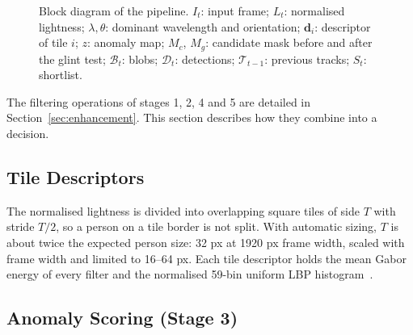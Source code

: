 \documentclass[conference,a4paper]{IEEEtran}
\begin{document}
\begin{figure}[!t]
{%
}
\caption{Block diagram of the pipeline. $I_t$: input frame; $L_t$: normalised lightness; $\lambda,\theta$: dominant wavelength and orientation; $\mathbf{d}_i$: descriptor of tile $i$; $z$: anomaly map; $M_c$, $M_g$: candidate mask before and after the glint test; $\mathcal{B}_t$: blobs; $\mathcal{D}_t$: detections; $\mathcal{T}_{t-1}$: previous tracks; $S_t$: shortlist.}
\label{fig:pipeline}
\end{figure}

The filtering operations of stages 1, 2, 4 and 5 are detailed in Section~\ref{sec:enhancement}. This section describes how they combine into a decision.

\subsection{Tile Descriptors}

The normalised lightness is divided into overlapping square tiles of side $T$ with stride $T/2$, so a person on a tile border is not split. With automatic sizing, $T$ is about twice the expected person size: 32 px at 1920 px frame width, scaled with frame width and limited to 16--64 px. Each tile descriptor holds the mean Gabor energy of every filter and the normalised 59-bin uniform LBP histogram~\cite{ojala}.

\subsection{Anomaly Scoring (Stage 3)}
\end{document}
